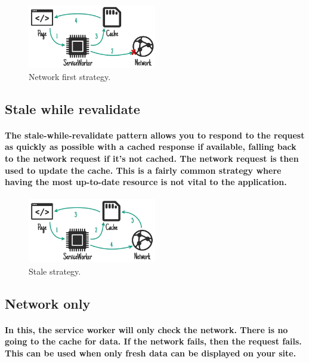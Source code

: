 \documentclass[12pt,a4paper]{article}
\begin{document}
    \begin{figure}[h!]
      \centering
      \includegraphics[width=0.5\textwidth]{networkfirst.png}
      \caption{Network first strategy.}
    \end{figure}

    \subsection{Stale while revalidate}

    \paragraph{The stale-while-revalidate pattern allows you to respond to the request as quickly as possible with a cached response if available, falling back to the network request if it’s not cached. The network request is then used to update the cache. This is a fairly common strategy where having the most up-to-date resource is not vital to the application.}

    \begin{figure}[h!]
      \centering
      \includegraphics[width=0.5\textwidth]{stale.png}
      \caption{Stale strategy.}
    \end{figure}

    \subsection{Network only}

    \paragraph{In this, the service worker will only check the network. There is no going to the cache for data. If the network fails, then the request fails. This can be used when only fresh data can be displayed on your site.}
\end{document}
